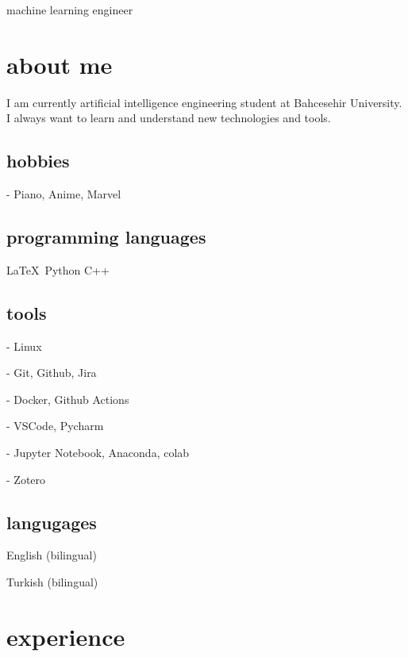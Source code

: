 \documentclass{resume-class} %
\begin{document}
\makeprofile

machine learning engineer
\drawsidebar
\section{about me}

I am currently artificial intelligence engineering student at Bahcesehir University. I always want to learn and understand new technologies and tools.

\subsection{hobbies}

- Piano, Anime, Marvel


\subsection{programming languages}

\LaTeX\ Python C++

\subsection{tools}
- Linux

- Git, Github, Jira

- Docker, Github Actions

- VSCode, Pycharm

- Jupyter Notebook, Anaconda, colab

- Zotero

\subsection{langugages}

English (bilingual)

Turkish (bilingual)


\section{experience}
\blindtext
\end{document}
